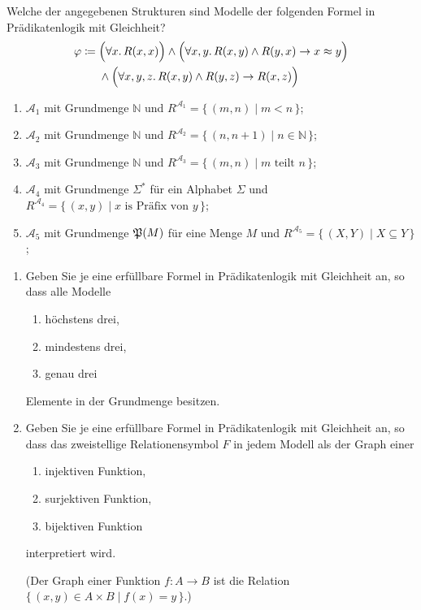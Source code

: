 \documentclass[german]{latteachCD}[2017/03/28]
\begin{document}
\clearpage

\enlargethispage{4\baselineskip}

\setcounter{exercise}{0}

\begin{exercise}
  Welche der angegebenen Strukturen sind Modelle der folgenden Formel in
  Prädikatenlogik mit Gleichheit?
  \begin{align*}
    \phi \coloneqq{}
    & \Bigl(\forall x.\, R(x,x)\Bigr) \land \Bigl(\forall x, y.\, R(x,y) \land
      R(y,x) \to x \approx y\Bigr)\\
    &\land \Bigl(\forall x, y, z.\, R(x,y) \land R(y,z) \to R(x,z)\Bigr)
  \end{align*}
  \begin{enumerate}
  \item $\mathcal{A}_{1}$ mit Grundmenge $\mathbb N$ und $R^{\mathcal{A}_{1}} =
    \{\,(m,n) \mid m < n \,\}$;
  \item $\mathcal{A}_{2}$ mit Grundmenge $\mathbb N$ und $R^{\mathcal{A}_{2}} =
    \{\,(n,n+1) \mid n \in \mathbb N \,\}$;
  \item $\mathcal{A}_{3}$ mit Grundmenge $\mathbb N$ und $R^{\mathcal{A}_{3}} =
    \{\,(m,n) \mid m \text{ teilt } n\,\}$;
  \item $\mathcal{A}_{4}$ mit Grundmenge $\Sigma^{*}$ für ein Alphabet $\Sigma$
    und $R^{\mathcal{A}_{4}} = \{\,(x,y) \mid x \text{ is Präfix von } y\,\}$;
  \item $\mathcal{A}_{5}$ mit Grundmenge $\subsets{M}$ für eine Menge $M$ und
    $R^{\mathcal{A}_{5}} = \{\,(X,Y) \mid X \subseteq Y\,\}$;
  \end{enumerate}
\end{exercise}

\begin{exercise}
  \begin{enumerate}
  \item Geben Sie je eine erfüllbare Formel in Prädikatenlogik mit Gleichheit
    an, so dass alle Modelle
    \begin{enumerate}
    \item höchstens drei,
    \item mindestens drei,
    \item genau drei
    \end{enumerate}
    Elemente in der Grundmenge besitzen.
  \item Geben Sie je eine erfüllbare Formel in Prädikatenlogik mit Gleichheit
    an, so dass das zweistellige Relationensymbol $F$ in jedem Modell als der
    Graph einer
    \begin{enumerate}
    \item injektiven Funktion,
    \item surjektiven Funktion,
    \item bijektiven Funktion
    \end{enumerate}
    interpretiert wird.

    (Der Graph einer Funktion $f \colon A \to B$ ist die Relation $\{\,(x,y) \in
    A \times B \mid f(x) = y\,\}$.)
  \end{enumerate}
\end{exercise}
\end{document}
